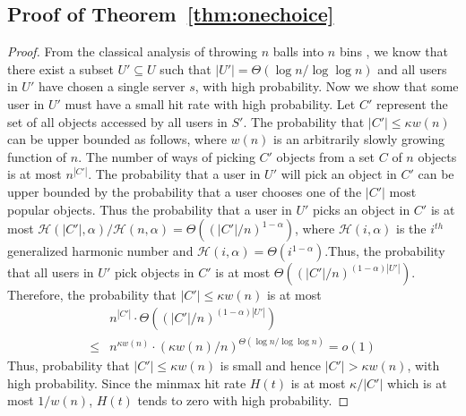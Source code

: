 \documentclass[conference]{IEEEtran}
\begin{document}
\subsection{Proof of Theorem~\ref{thm:onechoice}}

\begin{proof}
From the classical analysis of throwing $n$ balls into $n$ bins \cite{mitzenmacherRS2001}, we know that there exist a subset $U' \subseteq U$ such that  $|U'| = \Theta(\log n /\log\log n)$ and all users in $U'$ have chosen a single server $s$, with high probability. Now we show that some user in $U'$ must have a small hit rate with high probability. Let $C'$ represent the set of all objects accessed by all users in $S'$. The probability that $|C'| \leq \kappa w(n)$ can be upper bounded as follows, where $w(n)$ is an arbitrarily slowly growing function of $n$. The number of ways of picking $C'$ objects from a set $C$ of $n$ objects is at most $n^{|C'|}$. The probability that a user  in $U'$ will pick an object in $C'$ can be upper bounded by the probability that a user chooses one of the $|C'|$ most popular objects. Thus the probability that a user in $U'$ picks an object in $C'$  is at most $\mathcal{H}(|C'|,\alpha)/\mathcal{H}(n,\alpha) = \Theta( (|C'| / n)^{1-\alpha})$, where $\mathcal{H}(i,\alpha)$ is the $i^{th}$ generalized harmonic number and $\mathcal{H}(i,\alpha)=\Theta(i^{1 -\alpha})$.Thus, the probability that all users in $U'$ pick objects in $C'$  is at most $\Theta((|C'| /n)^{(1 - \alpha)|U'|})$.  Therefore, the probability that $|C'| \leq \kappa w(n)$ is at most
\begin{eqnarray}
& n^{|C'|}  \cdot \Theta((|C'| /n)^{(1 - \alpha)|U'|}) \nonumber\\
 \leq & n^{ \kappa w(n)} \cdot (\kappa w(n)/n)^{\Theta(\log n/\log\log n)}  = o(1) \nonumber
\end{eqnarray}
Thus, probability that $|C'| \leq \kappa w(n)$ is small and hence $|C'| > \kappa w(n)$, with high probability. Since the minmax hit rate $H(t)$ is at most $\kappa/|C'|$ which is at most $1/w(n)$, $H(t)$ tends to zero with high probability.
\end{proof}
\end{document}
